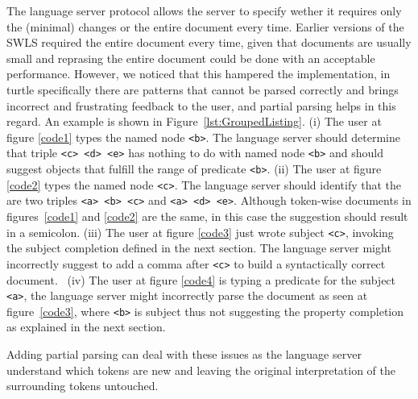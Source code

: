 
The language server protocol allows the server to specify wether it requires only the (minimal) changes or the entire document every time.
Earlier versions of the SWLS required the entire document every time, given that documents are usually small and reprasing the entire document could be done with an acceptable performance.
However, we noticed that this hampered the implementation, in turtle specifically there are patterns that cannot be parsed correctly and brings incorrect and frustrating feedback to the user, and partial parsing helps in this regard.
An example is shown in Figure~\ref{lst:GroupedListing}.
  (i) The user at figure \ref{code1} types the named node \texttt{<b>}. The language server should determine that triple \texttt{<c> <d> <e>} has nothing to do with named node \texttt{<b>} and should suggest objects that fulfill the range of predicate \texttt{<b>}. 
  (ii) The user at figure \ref{code2} types the named node \texttt{<c>}. The language server should identify that the are two triples \texttt{<a> <b> <c>} and \texttt{<a> <d> <e>}. Although token-wise documents in figures~\ref{code1} and \ref{code2} are the same, in this case the suggestion should result in a semicolon.
  (iii) The user at figure \ref{code3} just wrote subject \texttt{<c>}, invoking the subject completion defined in the next section. The language server might incorrectly suggest to add a comma after \texttt{<c>} to build a syntactically correct document.~
  (iv) The user at figure \ref{code4} is typing a predicate for the subject \texttt{<a>}, the language server might incorrectly parse the document as seen at figure~\ref{code3}, where \texttt{<b>} is subject thus not suggesting the property completion as explained in the next section.

  Adding partial parsing can deal with these issues as the language server understand which tokens are new and leaving the original interpretation of the surrounding tokens untouched. 


